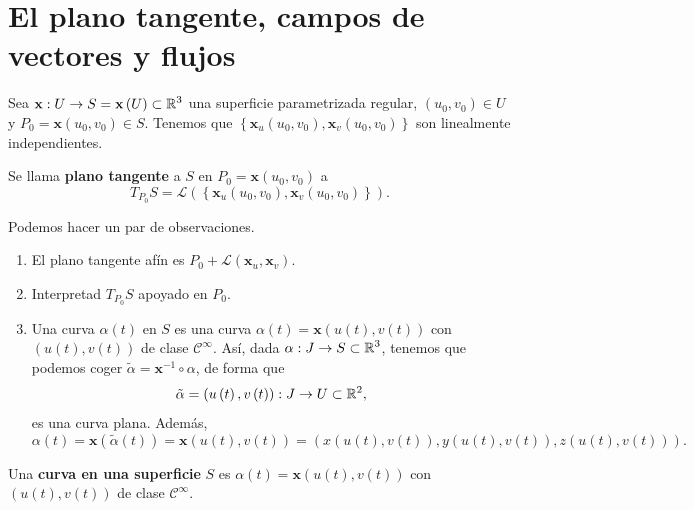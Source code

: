\section{El plano tangente, campos de vectores y flujos}
Sea $\displaystyle \textbf{x} : U \to S = \textbf{x} \left(U\right)\subset \mathbb{R}^{3} $ una superficie parametrizada regular, $\displaystyle \left(u_{0}, v_{0}\right)\in U $ y $\displaystyle P_{0}= \textbf{x} \left(u_{0}, v_{0}\right)\in S $. Tenemos que $\displaystyle \left\{ \textbf{x} _{u}\left(u_{0}, v_{0}\right), \textbf{x} _{v}\left(u_{0}, v_{0}\right)\right\}  $ son linealmente independientes. 
\begin{definition}
Se llama \textbf{plano tangente} a $\displaystyle S $ en $\displaystyle P_{0}= \textbf{x} \left(u_{0}, v_{0}\right) $ a 
\[T_{P_{0}}S = \mathcal{L}\left( \left\{ \textbf{x} _{u}\left(u_{0}, v_{0}\right), \textbf{x} _{v}\left(u_{0}, v_{0}\right)\right\} \right) .\]
\end{definition}
\begin{observation} Podemos hacer un par de observaciones.
\begin{enumerate}
\item El plano tangente afín es $\displaystyle P_{0} + \mathcal{L}\left( \textbf{x} _{u}, \textbf{x} _{v}\right) $. 
\item Interpretad $\displaystyle T_{P_{0}}S $ apoyado en $\displaystyle P_{0} $. 
\item Una curva $\displaystyle \alpha\left(t\right) $ en $\displaystyle S $ es una curva $\displaystyle \alpha\left(t\right)= \textbf{x} \left(u\left(t\right), v\left(t\right)\right) $ con $\displaystyle \left(u\left(t\right), v\left(t\right)\right) $ de clase $\displaystyle \mathcal{C}^{\infty } $. 
	Así, dada $\displaystyle \alpha : J \to S \subset \mathbb{R}^{3} $, tenemos que podemos coger $\displaystyle \tilde{\alpha} = \textbf{x} ^{-1}\circ \alpha  $, de forma que 
	\[\tilde{\alpha} = \left(u\left(t\right), v\left(t\right)\right) : J \to U \subset \mathbb{R}^{2} ,\]
	es una curva plana. Además, 
	\[\alpha\left(t\right)= \textbf{x} \left(\tilde{\alpha}\left(t\right)\right)= \textbf{x} \left(u\left(t\right), v\left(t\right)\right) = \left(x\left(u\left(t\right), v\left(t\right)\right), y\left(u\left(t\right), v\left(t\right)\right), z\left(u\left(t\right), v\left(t\right)\right)\right) .\]
\end{enumerate}
\end{observation}
\begin{definition}
Una \textbf{curva en una superficie} $\displaystyle S $ es $\displaystyle \alpha\left(t\right)= \textbf{x} \left(u\left(t\right), v\left(t\right)\right) $ con $\displaystyle \left(u\left(t\right), v\left(t\right)\right) $ de clase $\displaystyle \mathcal{C}^{\infty } $. 
\end{definition}
